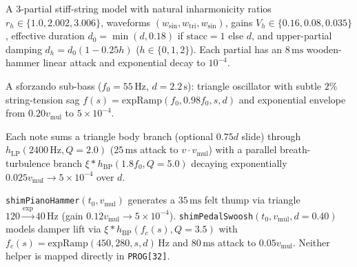 \begin{definition}
A 3-partial stiff-string model with natural inharmonicity ratios $r_h \in \{1.0, 2.002, 3.006\}$, waveforms $(w_{\mathrm{sin}}, w_{\mathrm{tri}}, w_{\mathrm{sin}})$, gains $V_h \in \{0.16, 0.08, 0.035\}$, effective duration $d_0 = \min(d, 0.18)$ if $\mathrm{stacc}=1$ else $d$, and upper-partial damping $d_h = d_0(1 - 0.25 h)$ ($h \in \{0,1,2\}$). Each partial has an $8\,\text{ms}$ wooden-hammer linear attack and exponential decay to $10^{-4}$.
\end{definition}

\begin{definition}
A sforzando sub-bass ($f_0 = 55\,\text{Hz}$, $d = 2.2\,\text{s}$): triangle oscillator with subtle $2\%$ string-tension sag $f(s) = \mathrm{expRamp}(f_0, 0.98 f_0, s, d)$ and exponential envelope from $0.20 v_{\mathrm{mul}}$ to $5\times 10^{-4}$.
\end{definition}

\begin{definition}
Each note sums a triangle body branch (optional $0.75d$ slide) through $h_{\mathrm{LP}}(2400\,\text{Hz}, Q=2.0)$ ($25\,\text{ms}$ attack to $v\cdot v_{\mathrm{mul}}$) with a parallel breath-turbulence branch $\xi * h_{\mathrm{BP}}(1.8 f_0, Q = 5.0)$ decaying exponentially $0.025 v_{\mathrm{mul}} \to 5\times 10^{-4}$ over $d$.
\end{definition}

\begin{definition}
\texttt{shimPianoHammer}$(t_0, v_{\mathrm{mul}})$ generates a $35\,\text{ms}$ felt thump via triangle $120 \xrightarrow{\exp} 40\,\text{Hz}$ (gain $0.12 v_{\mathrm{mul}} \to 5\times 10^{-4}$). \texttt{shimPedalSwoosh}$(t_0, v_{\mathrm{mul}}, d=0.40)$ models damper lift via $\xi * h_{\mathrm{BP}}(f_c(s), Q=3.5)$ with $f_c(s) = \mathrm{expRamp}(450, 280, s, d)\,\text{Hz}$ and $80\,\text{ms}$ attack to $0.05 v_{\mathrm{mul}}$. Neither helper is mapped directly in \texttt{PROG[32]}.
\end{definition}

